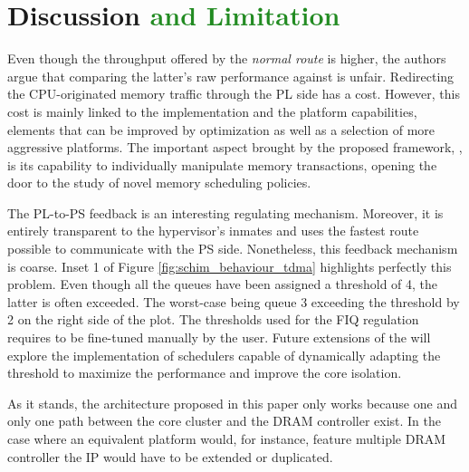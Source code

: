 \section{Discussion \textcolor{ForestGreen}{and Limitation}}
\color{red}
Even though the throughput offered by the \emph{normal route} is higher, the
authors argue that comparing the latter's raw performance against \schim is unfair.
Redirecting the CPU-originated memory traffic through the PL side has a cost.
However, this cost is mainly linked to the implementation and the platform capabilities, elements that can be improved by optimization as well as a selection of more aggressive platforms.
The important aspect brought by the proposed framework, \schim, is its capability to individually manipulate memory transactions, opening the door to the study of novel memory scheduling policies.

The PL-to-PS feedback is an interesting regulating mechanism. Moreover, it is entirely transparent to the hypervisor's inmates and uses the fastest route possible to communicate with the PS side. Nonetheless, this feedback mechanism is coarse. Inset 1 of Figure \ref{fig:schim_behaviour_tdma} highlights perfectly this problem. Even though all the queues have been assigned a threshold of 4, the latter is often exceeded. The worst-case being queue 3 exceeding the threshold by 2 on the right side of the plot.
The thresholds used for the FIQ regulation requires to be fine-tuned manually by the user. Future extensions of the \schim will explore the implementation of schedulers capable of dynamically adapting the threshold to maximize the performance and improve the core isolation.

\color{ForestGreen}

As it stands, the architecture proposed in this paper only works because one and
only one path between the core cluster and the DRAM controller exist. In the case
where an equivalent platform would, for instance, feature multiple DRAM controller
the \schim IP would have to be extended or duplicated.

